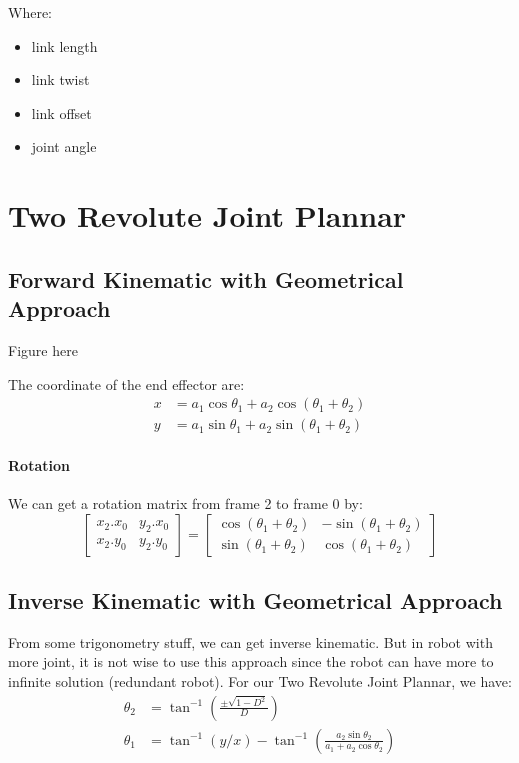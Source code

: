 Where:
\begin{itemize}
	\item { link length}
	\item { link twist}
	\item { link offset}
	\item { joint angle}
\end{itemize}





\section{Two Revolute Joint Plannar}
\subsection{Forward Kinematic with Geometrical Approach}

Figure here\hfil

The coordinate of the end effector are:
\begin{equation}
	\begin{split}
		x &= a_1 \cos \theta_1 + a_2 \cos(\theta_1+\theta_2)\\
		y &= a_1 \sin \theta_1 + a_2 \sin(\theta_1+\theta_2)
	\end{split}
\end{equation}
\paragraph{Rotation} We can get a rotation matrix from frame 2 to frame 0 by:
\begin{equation}
	\begin{bmatrix}
		x_2.x_0 & y_2.x_0 \\
		x_2.y_0 & y_2.y_0 
	\end{bmatrix}=
	\begin{bmatrix}
		\cos (\theta_1+\theta_2) & -\sin (\theta_1+\theta_2) \\
		\sin (\theta_1+\theta_2) & \cos (\theta_1+\theta_2)
	\end{bmatrix}
\end{equation}


\subsection{Inverse Kinematic with Geometrical Approach}
From some trigonometry stuff, we can get inverse kinematic. But in robot with more joint, it is not wise to use this approach since the robot can have more to infinite solution (redundant robot). For our Two Revolute Joint Plannar, we have:
\begin{equation}
	\begin{split}
		\theta_2 &= \tan^{-1} (\frac{\pm \sqrt{1-D^2}}{D}) \\
		\theta_1 &= \tan^{-1}(y/x) - \tan^{-1} (\frac{a_2 \sin \theta_2}{a_1 + a_2 \cos \theta_2})
	\end{split}
\end{equation}

